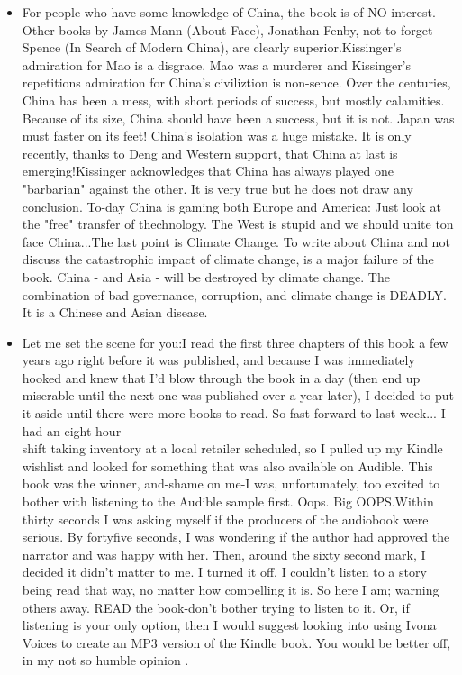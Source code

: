 \documentclass[11pt,openany,executivepaper]{book}
\begin{document}
\begin{itemize}
  \item For people who have some knowledge of China, the book is of NO interest. Other books by James Mann (About Face), Jonathan Fenby, not to forget Spence (In Search of Modern China), are clearly superior.Kissinger's admiration for Mao is a disgrace. Mao was a murderer and Kissinger's repetitions admiration for China's civiliztion is non-sence. Over the centuries, China has been a mess, with short periods of success, but mostly calamities. Because of its size, China should have been a success, but it is not. Japan was must faster on its feet! China's isolation was a huge mistake. It is only recently, thanks to Deng and Western support, that China at last is emerging!Kissinger acknowledges that China has always played one "barbarian" against the other. It is very true but he does not draw any conclusion. To-day China is gaming both Europe and America: Just look at the "free" transfer of thechnology. The West is stupid and we should unite ton face China...The last point is Climate Change. To write about China and not discuss the catastrophic impact of climate change, is a major failure of the book. China - and Asia - will be destroyed by climate change. The combination of bad governance, corruption, and climate change is DEADLY. It is a Chinese and Asian disease.
  \item Let me set the scene for you:I read the first three chapters of this book a few years ago right before it was published, and because I was immediately hooked and knew that I'd blow through the book in a day (then end up miserable until the next one was published over a year later), I decided to put it aside until there were more books to read. So fast forward to last week... I had an eight hour\\
shift taking inventory at a local retailer scheduled, so I pulled up my Kindle wishlist and looked for something that was also available on Audible. This book was the winner, and-shame on me-I was, unfortunately, too excited to bother with listening to the Audible sample first. Oops. Big OOPS.Within thirty seconds I was asking myself if the producers of the audiobook were serious. By fortyfive seconds, I was wondering if the author had approved the narrator and was happy with her. Then, around the sixty second mark, I decided it didn't matter to me. I turned it off. I couldn't listen to a story being read that way, no matter how compelling it is. So here I am; warning others away. READ the book-don't bother trying to listen to it. Or, if listening is your only option, then I would suggest looking into using Ivona Voices to create an MP3 version of the Kindle book. You would be better off, in my not so humble opinion .

\end{itemize}
\end{document}
